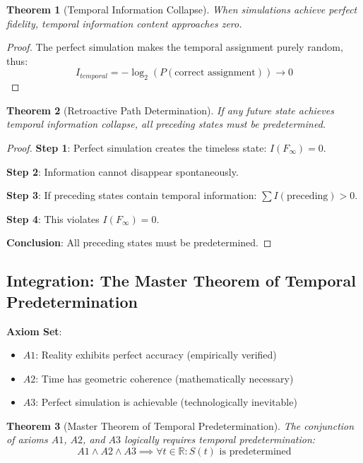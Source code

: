 \documentclass[11pt]{article}
\newtheorem{theorem}{Theorem}[section]
\theoremstyle{remark}
\begin{document}
\begin{theorem}[Temporal Information Collapse]
When simulations achieve perfect fidelity, temporal information content approaches zero.
\end{theorem}

\begin{proof}
The perfect simulation makes the temporal assignment purely random, thus:
$$I_{temporal} = -\log_2(P(\text{correct assignment})) \to 0$$
\end{proof}

\begin{theorem}[Retroactive Path Determination]
If any future state achieves temporal information collapse, all preceding states must be predetermined.
\end{theorem}

\begin{proof}
\textbf{Step 1}: Perfect simulation creates the timeless state: $I(F_\infty) = 0$.

\textbf{Step 2}: Information cannot disappear spontaneously.

\textbf{Step 3}: If preceding states contain temporal information: $\sum I(\text{preceding}) > 0$.

\textbf{Step 4}: This violates $I(F_\infty) = 0$.

\textbf{Conclusion}: All preceding states must be predetermined.
\end{proof}

\subsection{Integration: The Master Theorem of Temporal Predetermination}

\textbf{Axiom Set}:
\begin{itemize}
\item $A1$: Reality exhibits perfect accuracy (empirically verified)
\item $A2$: Time has geometric coherence (mathematically necessary)
\item $A3$: Perfect simulation is achievable (technologically inevitable)
\end{itemize}

\begin{theorem}[Master Theorem of Temporal Predetermination]
The conjunction of axioms $A1$, $A2$, and $A3$ logically requires temporal predetermination:
$$A1 \land A2 \land A3 \implies \forall t \in \mathbb{R}: S(t) \text{ is predetermined}$$
\end{theorem}
\end{document}
